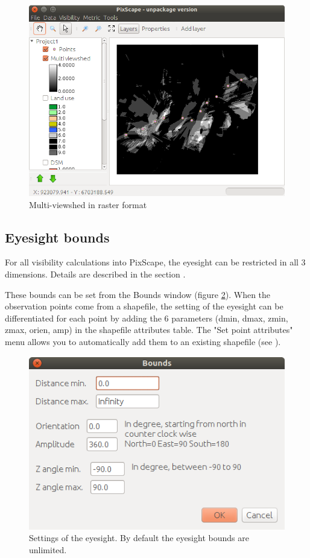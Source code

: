 \documentclass{report}
\begin{document}
\begin{figure}[H]
	\includegraphics[scale=0.5]{img/multi_viewshed_raster-en.png} 
	\caption{Multi-viewshed in raster format}
	\label{multi_viewshed_raster}
\end{figure}

\subsection{Eyesight bounds}
\label{bounds_ui}
For all visibility calculations into PixScape, the eyesight can be restricted in all 3 dimensions. Details are described in the section .

These bounds can be set from the Bounds window (figure \ref{bounds_dlg}). When the observation points come from a shapefile, the setting of the eyesight can be differentiated for each point by adding the 6 parameters (dmin, dmax, zmin, zmax, orien, amp) in the shapefile attributes table. The "Set point attributes" menu allows you to automatically add them to an existing shapefile (see ).

\begin{figure}[H]
	\includegraphics[scale=0.5]{img/bounds-en.png} 
	\caption{Settings of the eyesight. By default the eyesight bounds are unlimited.}
	\label{bounds_dlg}
\end{figure}
\end{document}
